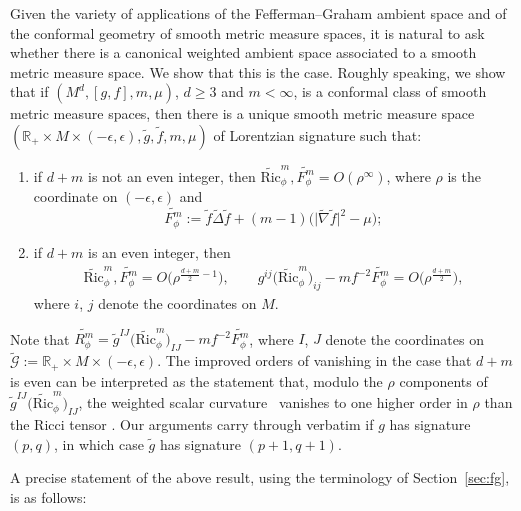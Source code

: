 \documentclass[10pt,a4paper]{amsart}
\DeclareMathOperator{\Ric}{Ric}
\newcommand{\cR}{\widetilde{R}}
\newcommand{\cRic}{\widetilde{\Ric}}
\numberwithin{equation}{section}
\begin{document}
Given the variety of applications of the Fefferman--Graham ambient space and of the conformal geometry of smooth metric measure spaces, it is natural to ask whether there is a canonical weighted ambient space associated to a smooth metric measure space. We show that this is the case.
Roughly speaking, we show that if $(M^d,[g,f],m,\mu)$, $d\geq 3$ and $m<\infty$, is a conformal class of smooth metric measure spaces, then there is a unique smooth metric measure space $(\mathbb{R}_+\times M\times (-\epsilon,\epsilon),\widetilde{g},\widetilde{f},m,\mu)$ of Lorentzian signature such that:
\begin{enumerate}[label=$(\roman*)$]\itemsep=0pt
\item if $d+m$ is not an even integer, then $\widetilde{\mathrm{Ric}}_\phi^m,\widetilde{F_\phi^m}=O(\rho^\infty)$, where $\rho$ is the coordinate on $(-\epsilon,\epsilon)$ and
 \[
 \widetilde{F_\phi^m}:=\widetilde{f}\widetilde{\Delta}\widetilde{f}+(m-1)\bigl(\big|\widetilde{\nabla} \widetilde{f}\big|^2-\mu\bigr);
 \]

\item if $d+m$ is an even integer, then
\begin{gather*}
 \widetilde{\mathrm{Ric}}_\phi^m,\widetilde{F_\phi^m}=O\bigl(\rho^{\frac{d+m}{2}-1}\bigr),
 \qquad
 g^{ij}\bigl(\widetilde{\mathrm{Ric}}_\phi^m\bigr)_{ij}-{m}{f}^{-2} \widetilde{F_\phi^m}=O\bigl(\rho^{\frac{d+m}{2}}\bigr),
\end{gather*}
where $i$, $j$ denote the coordinates on $M$.
\end{enumerate}
Note that $\widetilde{R_\phi^m}=\widetilde{g}^{IJ}\big(\widetilde{\mathrm{Ric}}_\phi^m\big)_{IJ}-m f^{-2}\widetilde{F_\phi^m}$, where $I$, $J$ denote the coordinates on $\widetilde{\mathcal{G}}:=\mathbb{R}_+\times M\times (-\epsilon,\epsilon)$. The improved orders of vanishing in the case that $d+m$ is even can be interpreted as the statement that, modulo the $\rho$ components of $\widetilde{g}^{IJ}\big(\widetilde{\mathrm{Ric}}_\phi^m\big)_{IJ}$,
the weighted scalar curvature~\smash{$\cR_\phi^m$} vanishes to one higher order in $\rho$ than the  Ricci tensor \smash{$\cRic_\phi^m$}. Our arguments carry through verbatim if $g$ has signature $(p,q)$, in which case $\widetilde{g}$ has signature $(p+1,q+1)$.

A precise statement of the above result, using the terminology of Section~\ref{sec:fg}, is as follows:
\end{document}
